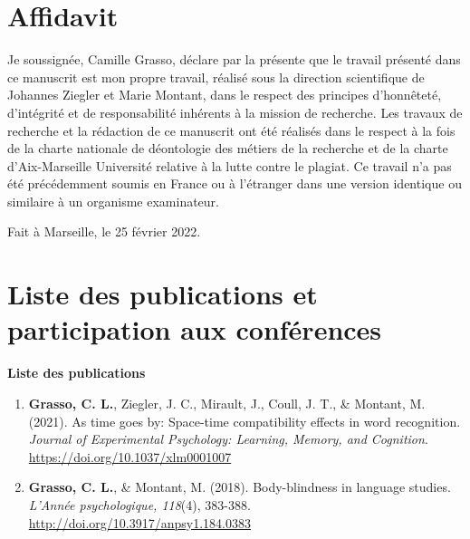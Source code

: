 \documentclass[
  a4paper,12pt,twoside,onecolumn,openright,final,oldfontcommands]{memoir}
\newcommand\blankpage{%
    \null
    \thispagestyle{empty}%
    \newpage
    }
\begin{document}
\restoregeometry



\blankpage

\setmainfont{Heuristica}

{}

\chapter*{Affidavit}

Je soussignée, Camille Grasso, déclare par la présente que le travail présenté dans ce manuscrit est mon propre travail, réalisé sous la direction scientifique de Johannes Ziegler et Marie Montant, dans le respect des principes d'honnêteté, d'intégrité et de responsabilité inhérents à la mission de recherche. Les travaux de recherche et la rédaction de ce manuscrit ont été réalisés dans le respect à la fois de la charte nationale de déontologie des métiers de la recherche et de la charte d'Aix-Marseille Université relative à la lutte contre le plagiat. Ce travail n'a pas été précédemment soumis en France ou à l'étranger dans une version identique ou similaire à un organisme examinateur.

\vspace{\baselineskip}

Fait à Marseille, le 25 février 2022.

\afterpage{\blankpage}

\chapter*{Liste des publications et participation aux conférences}

\textbf{Liste des publications}

\begin{enumerate}
\def\labelenumi{\arabic{enumi}.}
\item
  \textbf{Grasso, C. L.}, Ziegler, J. C., Mirault, J., Coull, J. T., \& Montant, M. (2021). As time goes by: Space-time compatibility effects in word recognition. \emph{Journal of Experimental Psychology: Learning, Memory, and Cognition}. \url{https://doi.org/10.1037/xlm0001007}
\item
  \textbf{Grasso, C. L.}, \& Montant, M. (2018). Body-blindness in language studies. \emph{L'Année psychologique, 118}(4), 383-388. \url{http://doi.org/10.3917/anpsy1.184.0383}
\end{enumerate}
\end{document}
